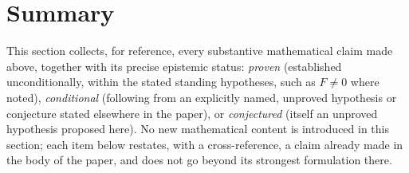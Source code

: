 \documentclass[11pt]{article}
\theoremstyle{remark}
\begin{document}
\section{Summary}
\label{sec:summary}

This section collects, for reference, every substantive mathematical claim
made above, together with its precise epistemic status: \emph{proven}
(established unconditionally, within the stated standing hypotheses, such
as $F\ne0$ where noted), \emph{conditional} (following from an explicitly
named, unproved hypothesis or conjecture stated elsewhere in the paper), or
\emph{conjectured} (itself an unproved hypothesis proposed here). No new
mathematical content is introduced in this section; each item below
restates, with a cross-reference, a claim already made in the body of the
paper, and does not go beyond its strongest formulation there.
\end{document}
